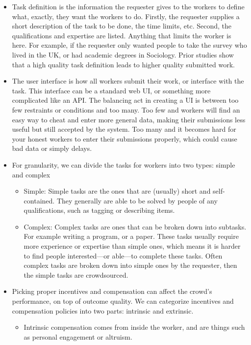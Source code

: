 \documentclass[9pt,twocolumn]{article}
\begin{document}
	\begin{itemize}
		\item Task definition is the information the requester gives to the workers to define what, exactly, they want the workers to do. Firstly, the requester supplies a short description of the task to be done, the time limits, etc. \cite{chen2011opportunities}
		Second, the qualifications and expertise are listed. Anything that limits the worker is here. For example, if the requester only wanted people to take the survey who lived in the UK, or had academic degrees in Sociology. Prior studies show that a high quality task definition leads to higher quality submitted work. \cite{chen2011opportunities}
		
		\item The user interface is how all workers submit their work, or interface with the task. This interface can be a standard web UI, or something more complicated like an API. The balancing act in creating a UI is between too few restraints or conditions and too many. Too few and workers will find an easy way to cheat and enter more general data, making their submissions less useful but still accepted by the system. \cite{allahbakhsh2013quality} Too many and it becomes hard for your honest workers to enter their submissions properly, which could cause bad data or simply delays.
		
		\item For granularity, we can divide the tasks for workers into two types: simple and complex
		\begin{itemize}
			\item Simple: Simple tasks are the ones that are (usually) short and self-contained. They generally are able to be solved by people of any qualifications, such as tagging or describing items. \cite{kittur2011crowdforge} 
			
			\item Complex: Complex tasks are ones that can be broken down into subtasks. For example writing a program, or a paper. These tasks usually require more experience or expertise than simple ones, which means it is harder to find people interested---or able---to complete these tasks. Often complex tasks are broken down into simple ones by the requester, then the simple tasks are crowdsourced.
		\end{itemize}
		
		\item Picking proper incentives and compensation can affect the crowd's performance, on top of outcome quality. \cite{scekic2012modeling}\cite{dow2012shepherding} We can categorize incentives and compensation policies into two parts: intrinsic and extrinsic.
		\begin{itemize}
			\item Intrinsic compensation comes from inside the worker, and are things such as personal engagement or altruism. 
			

\end{itemize}
\end{itemize}
\end{document}
